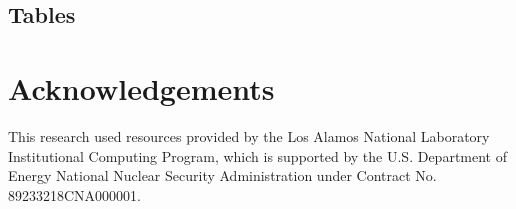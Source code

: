 \documentclass[draft]{styles/agujournal2019}
\begin{document}
\subsection{Tables}


\section{Acknowledgements}

This research used resources provided by the Los Alamos National Laboratory Institutional Computing Program, which is supported by the U.S. Department of Energy National Nuclear Security Administration under Contract No. 89233218CNA000001.
\end{document}
